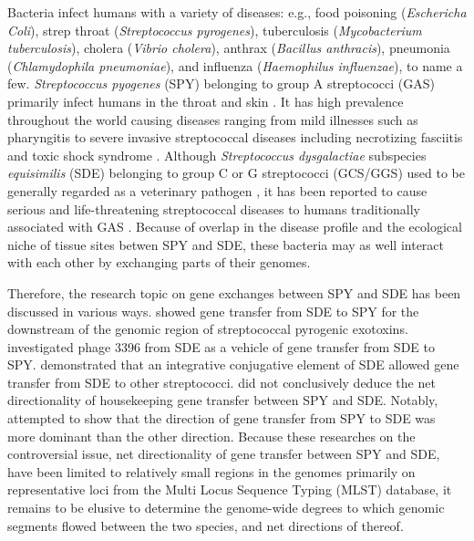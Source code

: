\documentclass[english]{article}
\begin{document}
Bacteria infect humans with a variety of diseases: e.g., food poisoning
(\textit{Eschericha Coli}), strep throat (\textit{Streptococcus pyrogenes}),
tuberculosis (\textit{Mycobacterium tuberculosis}), cholera (\textit{Vibrio
cholera}), anthrax (\textit{Bacillus anthracis}), pneumonia
(\textit{Chlamydophila pneumoniae}), and influenza (\textit{Haemophilus
influenzae}), to name a few.  \textit{Streptococcus pyogenes} (SPY) belonging to
group A streptococci (GAS) primarily infect humans in the throat and skin
\citep{Broyles2009}. It has high prevalence throughout the world causing
diseases ranging from mild illnesses such as pharyngitis to severe invasive
streptococcal diseases including necrotizing fasciitis and toxic shock syndrome
\citep{Cunningham2000a}.  Although \textit{Streptococcus dysgalactiae}
subspecies \textit{equisimilis} (SDE) belonging to group C or G streptococci
(GCS/GGS) used to be generally regarded as a veterinary pathogen
\citep{Vandamme1996}, it has been reported to cause serious and life-threatening
streptococcal diseases to humans traditionally associated with GAS
\citep[e.g.,][]{Brandt2009}.  Because of overlap in the disease profile and the
ecological niche of tissue sites betwen SPY and SDE, these bacteria may as well
interact with each other by exchanging parts of their genomes.  

Therefore, the research topic on gene exchanges between SPY and SDE has been
discussed in various ways. \citet{Sachse2002} showed gene transfer from SDE to
SPY for the downstream of the genomic region of streptococcal pyrogenic
exotoxins. \citet{Davies2007} investigated phage 3396 from SDE as
a vehicle of gene transfer from SDE to SPY. \citet{Davies2009} demonstrated that
an integrative conjugative element of SDE allowed gene transfer from SDE to
other streptococci.  \citet{Ahmad2009} did not conclusively deduce the net
directionality of housekeeping gene transfer between SPY and SDE.  Notably,
\citet{Kalia2001} attempted to show that the direction of gene transfer from SPY
to SDE was more dominant than the other direction.  Because these researches on
the controversial issue, net directionality of gene transfer between SPY and
SDE, have been limited to relatively small regions in the genomes primarily on
representative loci from the Multi Locus Sequence Typing (MLST) database, it
remains to be elusive to determine the genome-wide degrees to which genomic
segments flowed between the two species, and net directions of thereof.
\end{document}
